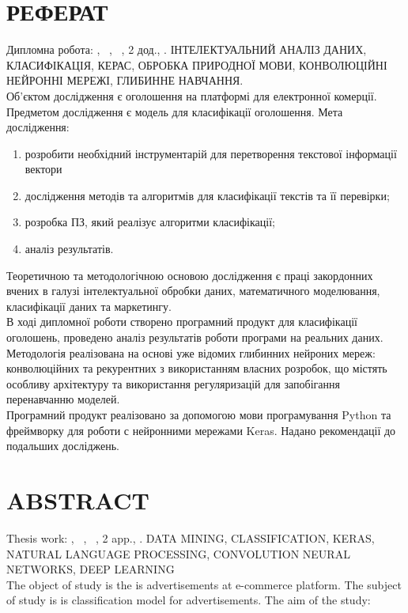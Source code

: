 \chapter*{РЕФЕРАТ}							%

Дипломна робота: , 
~,
~,
2 дод.,
.
ІНТЕЛЕКТУАЛЬНИЙ АНАЛІЗ ДАНИХ, КЛАСИФІКАЦІЯ, КЕРАС,
ОБРОБКА ПРИРОДНОЇ МОВИ, КОНВОЛЮЦІЙНІ НЕЙРОННІ МЕРЕЖІ, ГЛИБИННЕ НАВЧАННЯ.\\
Об’єктом дослідження є оголошення на платформі для електронної комерції. Предметом дослідження є модель для класифікації оголошення.
Мета дослідження:
\begin{enumerate}
	\item розробити необхідний інструментарій для перетворення текстової інформації вектори
	\item дослідження методів та алгоритмів для класифікації текстів та її перевірки;
	\item розробка ПЗ, який реалізує алгоритми класифікації;
    \item аналіз результатів.
\end{enumerate}

Теоретичною та методологічною основою дослідження є праці
закордонних вчених в галузі інтелектуальної обробки даних, математичного
моделювання, класифікації даних та маркетингу. \\
В ході дипломної роботи створено програмний продукт для класифікації оголошень, проведено аналіз результатів роботи програми на реальних даних. \\
Методологія реалізована на основі уже відомих глибинних нейроних мереж: конволюційних та рекурентних з використанням власних розробок, що містять особливу архітектуру та використання регуляризацій для запобігання перенавчанню моделей.\\
Програмний продукт реалізовано за допомогою мови програмування
Python та фреймворку для роботи с нейронними мережами Keras. Надано
рекомендації до подальших досліджень. \\


\chapter*{ABSTRACT}						


Thesis work: , 
~,
~,
2 app.,
.
DATA MINING, CLASSIFICATION, KERAS, NATURAL LANGUAGE PROCESSING, CONVOLUTION NEURAL NETWORKS, DEEP LEARNING \\
The object of study is the is advertisements at e-commerce
platform. The subject of study is is classification model for
advertisements.
The aim of the study:


